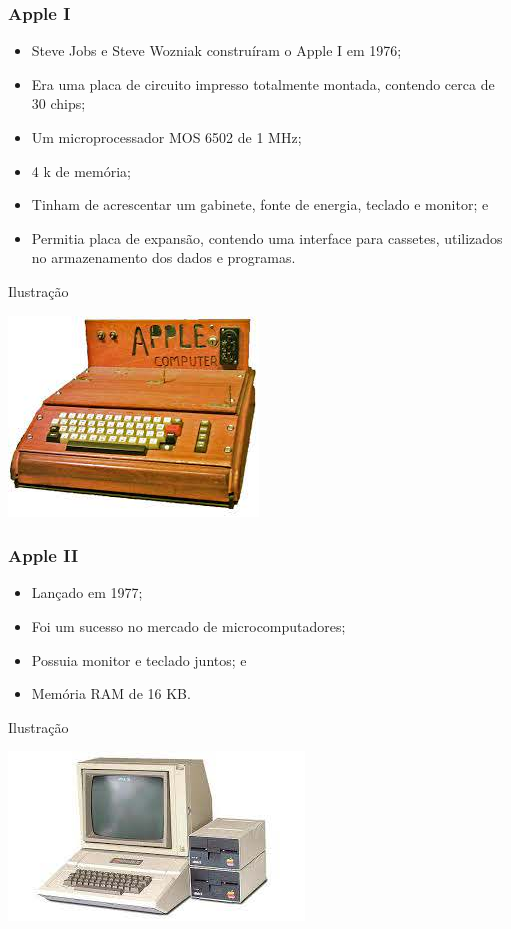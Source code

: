 \documentclass[aspectratio=169]{beamer} %
\begin{document}
\begin{frame}
	\frametitle{Apple I}
	
	\begin{itemize}
		\item Steve Jobs e Steve Wozniak construíram o Apple I em 1976;
		\item Era uma placa de circuito impresso totalmente montada, contendo cerca de 30 chips;
		\item Um microprocessador MOS 6502 de 1 MHz;
		\item 4 k de memória;
		\item Tinham de acrescentar um gabinete, fonte de energia, teclado e monitor; e
		\item Permitia placa de expansão, contendo uma interface para cassetes, utilizados no armazenamento dos dados e programas.
	\end{itemize}\vfill
	
	\begin{exampleblock}{Ilustra\c cão}
		\begin{center}
			\includegraphics[scale=0.4]{img/apple1}
		\end{center}	
	\end{exampleblock}
\end{frame}

\begin{frame}
	\frametitle{Apple II}
	
	\begin{itemize}
		\item Lançado em 1977;
		\item Foi um sucesso no mercado de microcomputadores; 
		\item Possuia monitor e teclado juntos; e
		\item Memória RAM de 16 KB.
	\end{itemize}\vfill
	
	\begin{exampleblock}{Ilustra\c cão}
		\begin{center}
			\includegraphics[scale=0.4]{img/apple2}
		\end{center}	
	\end{exampleblock}
\end{frame}
\end{document}
